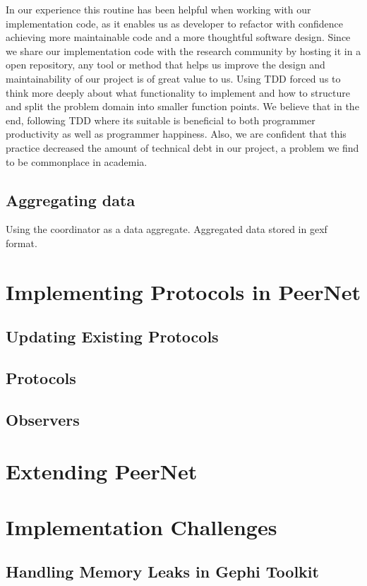 In our experience this routine has been helpful when working
with our implementation code, as it enables us as developer to
refactor with confidence achieving more maintainable code and a
more thoughtful software design. Since we share our
implementation code with the research community by hosting it in
a open repository, any tool or method that helps us improve the
design and maintainability of our project is of great value to
us. Using TDD forced us to think more deeply about what
functionality to implement and how to structure and split the
problem domain into smaller function points. We believe that in
the end, following TDD where its suitable is beneficial to both
programmer productivity as well as programmer happiness. Also,
we are confident that this practice decreased the amount of
technical debt in our project, a problem we find to be commonplace in academia.

\subsection{Aggregating data}
Using the coordinator as a data aggregate. Aggregated data
stored in gexf format.

\section{Implementing Protocols in PeerNet}
\subsection{Updating Existing Protocols}
\subsection{Protocols}
\subsection{Observers}

\section{Extending PeerNet}

\section{Implementation Challenges}

\subsection{Handling Memory Leaks in Gephi Toolkit}

